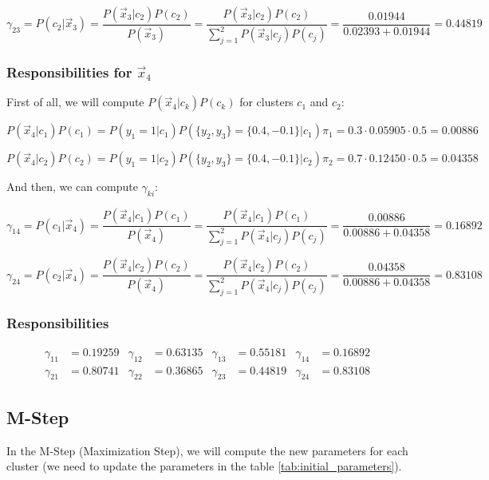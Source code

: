 \documentclass{article}
\begin{document}
\[ \gamma_{23} = P(c_2| \vec{x}_3) = \frac{P(\vec{x}_3 | c_2) P(c_2)}{P(\vec{x}_3)} = \frac{P(\vec{x}_3 | c_2) P(c_2)}{\sum_{j=1}^2 P(\vec{x}_3 | c_j) P(c_j)} = \frac{0.01944}{0.02393 + 0.01944} = 0.44819 \]

\subsubsection*{Responsibilities for $\vec{x}_4$}

First of all, we will compute $P(\vec{x}_4 | c_k) P(c_k)$ for clusters $c_1$ and $c_2$:

\[ P(\vec{x}_4 | c_1) P(c_1) = P(y_1 = 1 | c_1) P(\{y_2, y_3\}  = \{0.4, -0.1\} | c_1) \pi_1 = 0.3 \cdot 0.05905 \cdot 0.5 = 0.00886 \]

\[ P(\vec{x}_4 | c_2) P(c_2) = P(y_1 = 1 | c_2) P(\{y_2, y_3\}  = \{0.4, -0.1\} | c_2) \pi_2 = 0.7 \cdot 0.12450 \cdot 0.5 = 0.04358 \]

And then, we can compute $\gamma_{ki}$:

\[ \gamma_{14} = P(c_1| \vec{x}_4) = \frac{P(\vec{x}_4 | c_1) P(c_1)}{P(\vec{x}_4)} = \frac{P(\vec{x}_4 | c_1) P(c_1)}{\sum_{j=1}^2 P(\vec{x}_4 | c_j) P(c_j)} = \frac{0.00886}{0.00886 + 0.04358} = 0.16892 \]

\[ \gamma_{24} = P(c_2| \vec{x}_4) = \frac{P(\vec{x}_4 | c_2) P(c_2)}{P(\vec{x}_4)} = \frac{P(\vec{x}_4 | c_2) P(c_2)}{\sum_{j=1}^2 P(\vec{x}_4 | c_j) P(c_j)} = \frac{0.04358}{0.00886 + 0.04358} = 0.83108 \]

\subsubsection*{Responsibilities}

\begin{align*}
  \gamma_{11} &= 0.19259 & \gamma_{12} &= 0.63135 & \gamma_{13} &= 0.55181 & \gamma_{14} &= 0.16892 \\
  \gamma_{21} &= 0.80741 & \gamma_{22} &= 0.36865 & \gamma_{23} &= 0.44819 & \gamma_{24} &= 0.83108
\end{align*}

\subsection*{M-Step}

In the M-Step (Maximization Step), we will compute the new parameters for each cluster (we need to update the parameters in the table \ref{tab:initial_parameters}).
\end{document}
